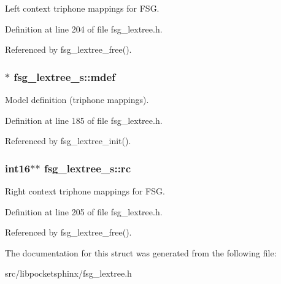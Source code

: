 Left context triphone mappings for F\+S\+G. 



Definition at line 204 of file fsg\+\_\+lextree.\+h.



Referenced by fsg\+\_\+lextree\+\_\+free().

\subsubsection[{mdef}]{$\ast$ fsg\+\_\+lextree\+\_\+s\+::mdef}\label{structfsg__lextree__s_ae2c059413a1cb4cda7068ab30a7a477c}


Model definition (triphone mappings). 



Definition at line 185 of file fsg\+\_\+lextree.\+h.



Referenced by fsg\+\_\+lextree\+\_\+init().

\subsubsection[{rc}]{\setlength{\rightskip}{0pt plus 5cm}int16$\ast$$\ast$ fsg\+\_\+lextree\+\_\+s\+::rc}\label{structfsg__lextree__s_a307d5351803d409aa51395333294c0f1}


Right context triphone mappings for F\+S\+G. 



Definition at line 205 of file fsg\+\_\+lextree.\+h.



Referenced by fsg\+\_\+lextree\+\_\+free().



The documentation for this struct was generated from the following file\+:\begin{DoxyCompactItemize}
\item 
src/libpocketsphinx/fsg\+\_\+lextree.\+h\end{DoxyCompactItemize}
